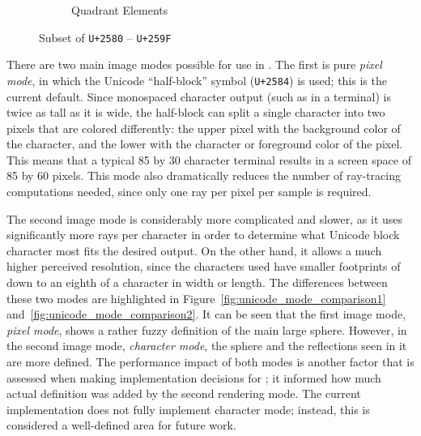 \begin{figure}[htb]
\begin{subfigure}[htb]{0.51\textwidth}
    \caption{Quadrant Elements}
    \label{fig:unicode_quadrant_characters}
  \end{subfigure}
  \caption{Subset of \texttt{U+2580} -- \texttt{U+259F} \cite{unicode}}
  \label{fig:unicode_characters}
\end{figure}

There are two main image modes possible for use in \name.
The first is pure {\it pixel mode}, in which the Unicode ``half-block'' symbol (\texttt{U+2584}) is used; this is the current default.
Since monospaced character output (such as in a terminal) is twice as tall as it is wide, the half-block can split a single character into two pixels that are colored differently: the upper pixel with the background color of the character, and the lower with the character or foreground color of the pixel.
This means that a typical 85 by 30 character terminal results in a screen space of 85 by 60 pixels.
This mode also dramatically reduces the number of ray-tracing computations needed, since only one ray per pixel per sample is required.

The second image mode is considerably more complicated and slower, as it uses significantly more rays per character in order to determine what Unicode block character most fits the desired output.
On the other hand, it allows a much higher perceived resolution, since the characters used have smaller footprints of down to an eighth of a character in width or length.
The differences between these two modes are highlighted in Figure~\ref{fig:unicode_mode_comparison1} and~\ref{fig:unicode_mode_comparison2}.
It can be seen that the first image mode, {\it pixel mode}, shows a rather fuzzy definition of the main large sphere.
However, in the second image mode, {\it character mode}, the sphere and the reflections seen in it are more defined.
The performance impact of both modes is another factor that is assessed when making implementation decisions for \name; it informed how much actual definition was added by the second rendering mode.
The current implementation does not fully implement character mode; instead, this is considered a well-defined area for future work.

